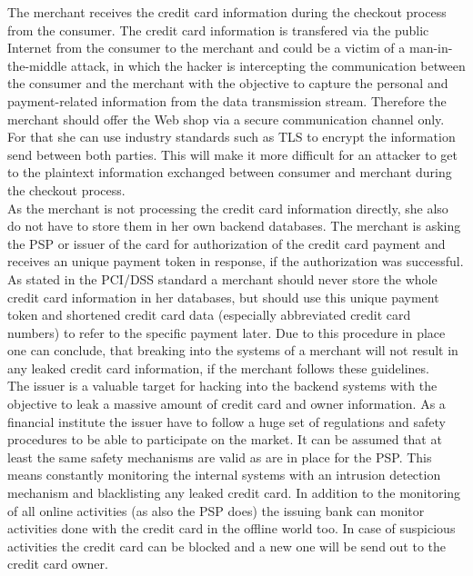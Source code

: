 The merchant receives the credit card information during the checkout process from the consumer. The credit card information is transfered via the public Internet from the consumer to the merchant and could be a victim of a man-in-the-middle attack, in which the hacker is intercepting the communication between the consumer and the merchant with the objective to capture the personal and payment-related information from the data transmission stream. Therefore the merchant should offer the Web shop via a secure communication channel only. For that she can use industry standards such as TLS to encrypt the information send between both parties. This will make it more difficult for an attacker to get to the plaintext information exchanged between consumer and merchant during the checkout process. \\

As the merchant is not processing the credit card information directly, she also do not have to store them in her own backend databases. The merchant is asking the \gls{PSP} or issuer of the card for authorization of the credit card payment and receives an unique payment token in response, if the authorization was successful. As stated in the PCI/DSS standard \citep{virtue2009payment} a merchant should never store the whole credit card information in her databases, but should use this unique payment token and shortened credit card data (especially abbreviated credit card numbers) to refer to the specific payment later. Due to this procedure in place one can conclude, that breaking into the systems of a merchant will not result in any leaked credit card information, if the merchant follows these guidelines. \\

The issuer is a valuable target for hacking into the backend systems with the objective to leak a massive amount of credit card and owner information. As a financial institute the issuer have to follow a huge set of regulations and safety procedures to be able to participate on the market. It can be assumed that at least the same safety mechanisms are valid as are in place for the \gls{PSP}. This means constantly monitoring the internal systems with an intrusion detection mechanism and blacklisting any leaked credit card. In addition to the monitoring of all online activities (as also the \gls{PSP} does) the issuing bank can monitor activities done with the credit card in the offline world too. In case of suspicious activities the credit card can be blocked and a new one will be send out to the credit card owner. \\

